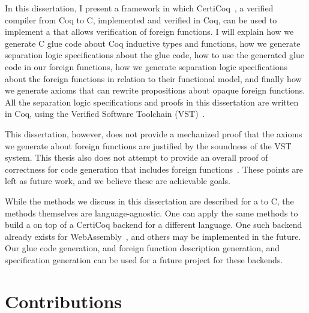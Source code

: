 In this dissertation, I present a framework in which CertiCoq~\cite{certicoq}, a verified compiler from Coq to C, implemented and verified in Coq, can be used to implement a \ffi{} that allows verification of \gls{foreign function}s. I will explain how we generate C \gls{glue code} about Coq inductive types and functions, how we generate separation logic specifications about the \gls{glue code}, how to use the generated \gls{glue code} in our \gls{foreign function}s, how we generate separation logic specifications about the \gls{foreign function}s in relation to their \gls{functional model}, and finally how we generate axioms that can rewrite propositions about opaque \gls{foreign function}s. All the separation logic specifications and proofs in this dissertation are written in Coq, using the Verified Software Toolchain (VST)~\cite{appel2014program}.

This dissertation, however, does not provide a mechanized proof that the axioms we generate about \gls{foreign function}s are justified by the soundness of the VST system. This thesis also does not attempt to provide an overall proof of correctness for code generation that includes \gls{foreign function}s~\cite{belanger2019verified}. These points are left as future work, and we believe these are achievable goals.

While the methods we discuss in this dissertation are described for a \ffi{} to C, the methods themselves are language-agnostic. One can apply the same methods to build a \ffi{} on top of a CertiCoq backend for a different language. One such backend already exists for WebAssembly~\cite{meier2023certicoq}, and others may be implemented in the future. Our \gls{glue code} generation, \constructor{} and \gls{foreign function} description generation, and specification generation can be used for a future \ffi{} project for these backends.




\section{Contributions}

